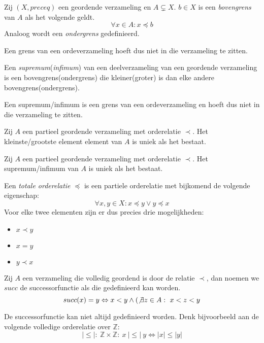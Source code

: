 \documentclass[main.tex]{subfiles}
\begin{document}
\begin{de}
  Zij $(X,preceq)$ een geordende verzameling en $A \subsetneq X$.
  $b \in X$ is een \emph{bovengrens} van $A$ als het volgende geldt.
  \[ \forall x \in A: x \preceq b \]
  Analoog wordt een \emph{ondergrens} gedefinieerd.
\end{de}

\begin{opm}
  Een grens van een ordeverzameling hoeft dus niet in die verzameling te zitten.
\end{opm}

\begin{de}
  Een \emph{supremum}(\emph{infimum}) van een deelverzameling van een geordende verzameling is een bovengrens(ondergrens) die kleiner(groter) is dan elke andere bovengrens(ondergrens).
\end{de}

\begin{opm}
  Een supremum/infimum is een grens van een ordeverzameling en hoeft dus niet in die verzameling te zitten.
\end{opm}

\begin{st}
  Zij $A$ een partieel geordende verzameling met orderelatie $\prec$.
  Het kleinste/grootste element element van $A$ is uniek als het bestaat.

\end{st}

\begin{st}
  Zij $A$ een partieel geordende verzameling met orderelatie $\prec$.
  Het supremum/infimum van $A$ is uniek als het bestaat.

\end{st}

\begin{de}
  Een \emph{totale orderelatie} $\preceq$ is een partiele orderelatie met bijkomend de volgende eigenschap:
  \[ \forall x,y \in X: x \preceq y \vee y \preceq x \]
  Voor elke twee elementen zijn er dus precies drie mogelijkheden:
  \begin{itemize}
  \item $x \prec y$
  \item $x = y$
  \item $y \prec x$
  \end{itemize}
\end{de}

\begin{de}
  Zij $A$ een verzameling die volledig geordend is door de relatie $\prec$, dan noemen we $succ$ de successorfunctie als die gedefinieerd kan worden.
  \[ succ(x) = y \Leftrightarrow x < y \wedge (\not\exists z \in A:\ x < z < y \]
\end{de}

\begin{opm}
  De successorfunctie kan niet altijd gedefinieerd worden.
  Denk bijvoorbeeld aan de volgende volledige orderelatie over $\mathbb{Z}$:
  \[ |\le|:\ \mathbb{Z} \times \mathbb{Z}:\ x\ |\le|\ y \Leftrightarrow |x| \le |y| \]
\end{opm}
\end{document}
